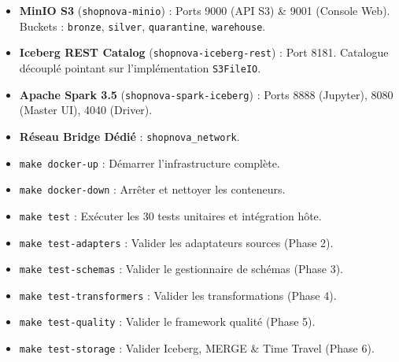 \documentclass[9pt,a4paper,landscape]{article}
\begin{document}
\noindent
\begin{minipage}[t]{0.485\textwidth}
    \begin{tcolorbox}[colback=headerbg,colframe=primary,title=\textbf{Services Docker Déployés (docker-compose.yml)},top=1mm,bottom=1mm,left=2mm,right=2mm]
        \scriptsize
        \begin{itemize}[leftmargin=*,itemsep=1pt]
            \item \textbf{MinIO S3} (\texttt{shopnova-minio}) : Ports 9000 (API S3) \& 9001 (Console Web). Buckets : \texttt{bronze}, \texttt{silver}, \texttt{quarantine}, \texttt{warehouse}.
            \item \textbf{Iceberg REST Catalog} (\texttt{shopnova-iceberg-rest}) : Port 8181. Catalogue découplé pointant sur l'implémentation \texttt{S3FileIO}.
            \item \textbf{Apache Spark 3.5} (\texttt{shopnova-spark-iceberg}) : Ports 8888 (Jupyter), 8080 (Master UI), 4040 (Driver).
            \item \textbf{Réseau Bridge Dédié} : \texttt{shopnova\_network}.
        \end{itemize}
    \end{tcolorbox}
\end{minipage}\hfill
\begin{minipage}[t]{0.485\textwidth}
    \begin{tcolorbox}[colback=headerbg,colframe=secondary,title=\textbf{Commandes Makefile pour Validation \& Reprise},top=1mm,bottom=1mm,left=2mm,right=2mm]
        \scriptsize
        \begin{itemize}[leftmargin=*,itemsep=1pt]
            \item \texttt{make docker-up} : Démarrer l'infrastructure complète.
            \item \texttt{make docker-down} : Arrêter et nettoyer les conteneurs.
            \item \texttt{make test} : Exécuter les 30 tests unitaires et intégration hôte.
            \item \texttt{make test-adapters} : Valider les adaptateurs sources (Phase 2).
            \item \texttt{make test-schemas} : Valider le gestionnaire de schémas (Phase 3).
            \item \texttt{make test-transformers} : Valider les transformations (Phase 4).
            \item \texttt{make test-quality} : Valider le framework qualité (Phase 5).
            \item \texttt{make test-storage} : Valider Iceberg, MERGE \& Time Travel (Phase 6).
        \end{itemize}
    \end{tcolorbox}
\end{minipage}
\end{document}
